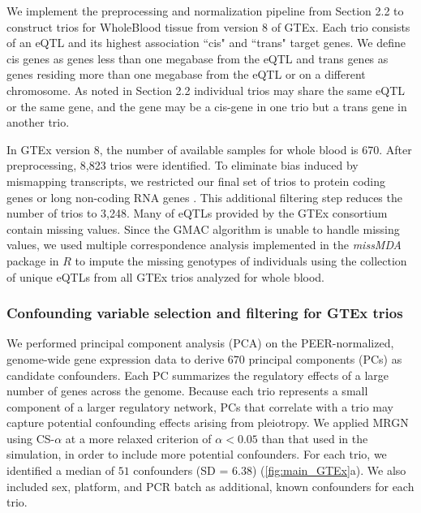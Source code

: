 \documentclass[12pt,letterpaper]{report}
\begin{document}
\begin{doublespace}
We implement the preprocessing and normalization pipeline from Section 2.2 to construct trios for WholeBlood tissue from version 8 of GTEx. Each trio consists of an eQTL and its highest association ``cis" and ``trans" target genes.  We define cis genes as genes less than one megabase from the eQTL and trans genes as genes residing more than one megabase from the eQTL or on a different chromosome. As noted in Section 2.2 individual trios may share the same eQTL or the same gene, and the gene may be a cis-gene in one trio but a trans gene in another trio. 

In GTEx version 8, the number of available samples for whole blood is 670. After preprocessing, 8,823 trios were identified. To eliminate bias induced by mismapping transcripts, we restricted our final set of trios to protein coding genes or long non-coding RNA genes \cite{yang2017identifying}. This additional filtering step reduces the number of trios to 3,248.  Many of eQTLs provided by the GTEx consortium contain missing values. Since the GMAC algorithm is unable to handle missing values, we used multiple correspondence analysis implemented in the \textit{missMDA} package in $R$ \cite{josse2016missmda} to impute the missing genotypes of individuals using the collection of unique eQTLs from all GTEx trios analyzed for whole blood. 

\subsubsection{Confounding variable selection and filtering for GTEx trios}

We performed principal component analysis (PCA) on the PEER-normalized, genome-wide gene expression data to derive $670$ 
principal components (PCs) as candidate confounders.  
Each PC summarizes the regulatory effects of a large number of genes across the genome. 
Because each trio represents a small component of a larger regulatory network, PCs that correlate with a trio may capture 
potential confounding effects arising from pleiotropy. 
We applied MRGN using CS-$\alpha$ at a more relaxed criterion of $\alpha < 0.05$ than that used 
in the simulation, in order to include more potential confounders. 
For each trio, we identified a median of $51$ confounders (SD = $6.38$) (\autoref{fig:main_GTEx}a). 
We also included sex, platform, and PCR batch as additional, known confounders for each trio.



\end{doublespace}
\end{document}
